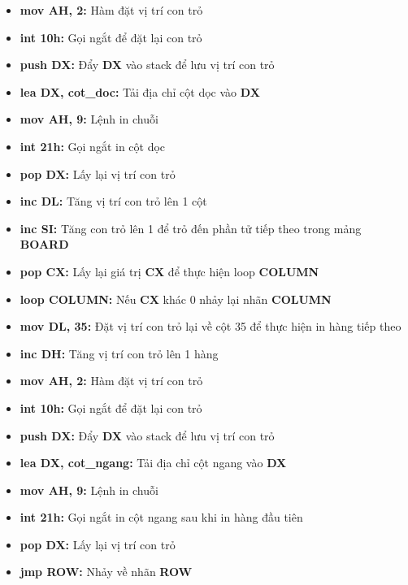 \begin{itemize}
\begin{itemize}
        \item \textbf{mov AH, 2:} Hàm đặt vị trí con trỏ
        \item \textbf{int 10h:} Gọi ngắt để đặt lại con trỏ
        \item \textbf{push DX:} Đẩy \textbf{DX} vào stack để lưu vị trí con trỏ
        \item \textbf{lea DX, cot\_doc:} Tải địa chỉ cột dọc vào \textbf{DX}
        \item \textbf{mov AH, 9:} Lệnh in chuỗi
        \item \textbf{int 21h:} Gọi ngắt in cột dọc
        \item \textbf{pop DX:} Lấy lại vị trí con trỏ
        \item \textbf{inc DL:} Tăng vị trí con trỏ lên 1 cột
        \item \textbf{inc SI:} Tăng con trỏ lên 1 để trỏ đến phần tử tiếp theo trong mảng \textbf{BOARD}
        \item \textbf{pop CX:} Lấy lại giá trị \textbf{CX} để thực hiện loop \textbf{COLUMN}
        \item \textbf{loop COLUMN:} Nếu \textbf{CX} khác 0 nhảy lại nhãn \textbf{COLUMN}
        \item \textbf{mov DL, 35:} Đặt vị trí con trỏ lại về cột 35 để thực hiện in hàng tiếp theo
        \item \textbf{inc DH:}  Tăng vị trí con trỏ lên 1 hàng
        \item \textbf{mov AH, 2:} Hàm đặt vị trí con trỏ
        \item \textbf{int 10h:} Gọi ngắt để đặt lại con trỏ
        \item \textbf{push DX:}  Đẩy \textbf{DX} vào stack để lưu vị trí con trỏ
        \item \textbf{lea DX, cot\_ngang:} Tải địa chỉ cột ngang vào \textbf{DX}
        \item \textbf{mov AH, 9:} Lệnh in chuỗi
        \item \textbf{int 21h:} Gọi ngắt in cột ngang sau khi in hàng đầu tiên 
        \item \textbf{pop DX:} Lấy lại vị trí con trỏ
        \item \textbf{jmp ROW:} Nhảy về nhãn \textbf{ROW}
    \end{itemize}
\end{itemize}


